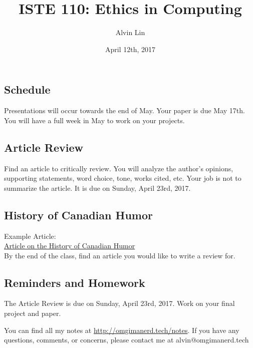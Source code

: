 \documentclass{article}
\title{ISTE 110: Ethics in Computing}
\author{Alvin Lin}
\date{April 12th, 2017}
\begin{document}
\maketitle

\subsection*{Schedule}
Presentations will occur towards the end of May. Your paper is due May 17th.
You will have a full week in May to work on your projects.

\subsection*{Article Review}
Find an article to critically review. You will analyze the author's opinions,
supporting statements, word choice, tone, works cited, etc. Your job is not
to summarize the article. It is due on Sunday, April 23rd, 2017.

\subsection*{History of Canadian Humor}
Example Article: \\
\href{http://www.vanityfair.com/culture/2013/01/history-canadian-humor}
{Article on the History of Canadian Humor} \\
By the end of the class, find an article you would like to write a review for.

\subsection*{Reminders and Homework}
The Article Review is due on Sunday, April 23rd, 2017.
Work on your final project and paper.

\begin{center}
  You can find all my notes at \url{http://omgimanerd.tech/notes}. If you have
  any questions, comments, or concerns, please contact me at
  alvin@omgimanerd.tech
\end{center}
\end{document}
